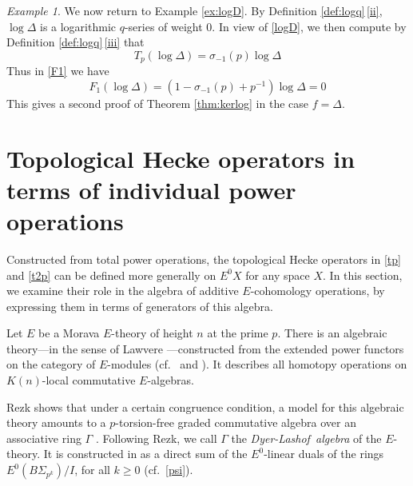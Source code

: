 \documentclass{gtpart}
\theoremstyle{definition}
\theoremstyle{remark}
\newtheorem{ex}[equation]{Example}
\newcommand{\DL}{Dyer-Lashof~}
\renewcommand{\D}{\Delta}
\newcommand{\G}{\Gamma}
\newcommand{\si}{\sigma}
\renewcommand{\=}{\approx}
\renewcommand{\-}{\sim}
\numberwithin{equation}{section}
\begin{document}
\begin{ex}
 \label{ex:pf}
 We now return to Example \ref{ex:logD}.  By Definition 
 \ref{def:logq}\,\eqref{ii}, $\log \D$ is a logarithmic $q$-series of weight 0.  
 In view of \eqref{logD}, we then compute by Definition 
 \ref{def:logq}\,\eqref{iii} that 
 \[
  T_p (\log \D) = \si_{-1}(p) \log \D 
 \]
 Thus in \eqref{F1} we have 
 \[
  F_1 (\log \D) = \left( 1 - \si_{-1}(p) + p^{-1} \right) \log \D = 0 
 \]
 This gives a second proof of Theorem \ref{thm:kerlog} in the case $f = \D$.  
\end{ex}



\section{Topological Hecke operators in terms of individual power operations}
\label{sec:individual}

Constructed from total power operations, the topological Hecke operators in 
\eqref{tp} and \eqref{t2p} can be defined more generally on $E^0 X$ for any 
space $X$.  In this section, we examine their role in the algebra of additive 
$E$-cohomology operations, by expressing them in terms of generators of this 
algebra.  

Let $E$ be a Morava $E$-theory of height $n$ at the prime $p$.  There is an 
algebraic theory---in the sense of Lawvere \cite{Lawvere}---constructed from the 
extended power functors on the category of $E$-modules 
(cf.~\cite[Section 9]{lpo} and \cite[Section 4]{cong}).  It describes all 
homotopy operations on $K(n)$-local commutative $E$-algebras.  

Rezk shows that under a certain congruence condition, a model for this algebraic 
theory amounts to a $p$-torsion-free graded commutative algebra over an 
associative ring $\G$ \cite[Theorem A]{cong}.  Following Rezk, we call $\G$ the 
{\em \DL algebra} of the $E$-theory.  It is constructed in \cite[6.2]{cong} as a 
direct sum of the $E^0$-linear duals of the rings $E^0(B\Sigma_{p^k}) / I$, for 
all $k \geq 0$ (cf.~\eqref{psi}).  
\end{document}
